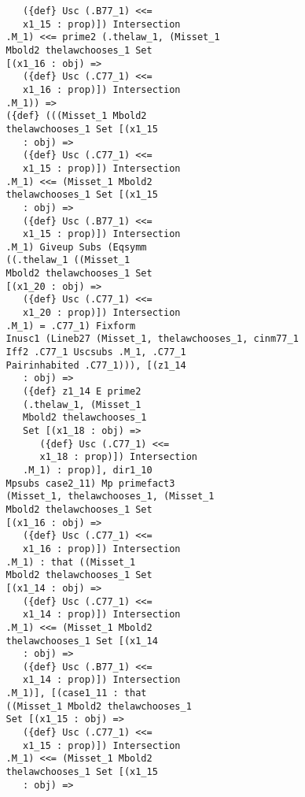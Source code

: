 \documentclass[12pt]{article}
\begin{document}
\begin{verbatim}
                   ({def} Usc (.B77_1) <<= 
                   x1_15 : prop)]) Intersection 
                .M_1) <<= prime2 (.thelaw_1, (Misset_1 
                Mbold2 thelawchooses_1 Set 
                [(x1_16 : obj) => 
                   ({def} Usc (.C77_1) <<= 
                   x1_16 : prop)]) Intersection 
                .M_1)) => 
                ({def} (((Misset_1 Mbold2 
                thelawchooses_1 Set [(x1_15 
                   : obj) => 
                   ({def} Usc (.C77_1) <<= 
                   x1_15 : prop)]) Intersection 
                .M_1) <<= (Misset_1 Mbold2 
                thelawchooses_1 Set [(x1_15 
                   : obj) => 
                   ({def} Usc (.B77_1) <<= 
                   x1_15 : prop)]) Intersection 
                .M_1) Giveup Subs (Eqsymm 
                ((.thelaw_1 ((Misset_1 
                Mbold2 thelawchooses_1 Set 
                [(x1_20 : obj) => 
                   ({def} Usc (.C77_1) <<= 
                   x1_20 : prop)]) Intersection 
                .M_1) = .C77_1) Fixform 
                Inusc1 (Lineb27 (Misset_1, thelawchooses_1, cinm77_1 
                Iff2 .C77_1 Uscsubs .M_1, .C77_1 
                Pairinhabited .C77_1))), [(z1_14 
                   : obj) => 
                   ({def} z1_14 E prime2 
                   (.thelaw_1, (Misset_1 
                   Mbold2 thelawchooses_1 
                   Set [(x1_18 : obj) => 
                      ({def} Usc (.C77_1) <<= 
                      x1_18 : prop)]) Intersection 
                   .M_1) : prop)], dir1_10 
                Mpsubs case2_11) Mp primefact3 
                (Misset_1, thelawchooses_1, (Misset_1 
                Mbold2 thelawchooses_1 Set 
                [(x1_16 : obj) => 
                   ({def} Usc (.C77_1) <<= 
                   x1_16 : prop)]) Intersection 
                .M_1) : that ((Misset_1 
                Mbold2 thelawchooses_1 Set 
                [(x1_14 : obj) => 
                   ({def} Usc (.C77_1) <<= 
                   x1_14 : prop)]) Intersection 
                .M_1) <<= (Misset_1 Mbold2 
                thelawchooses_1 Set [(x1_14 
                   : obj) => 
                   ({def} Usc (.B77_1) <<= 
                   x1_14 : prop)]) Intersection 
                .M_1)], [(case1_11 : that 
                ((Misset_1 Mbold2 thelawchooses_1 
                Set [(x1_15 : obj) => 
                   ({def} Usc (.C77_1) <<= 
                   x1_15 : prop)]) Intersection 
                .M_1) <<= (Misset_1 Mbold2 
                thelawchooses_1 Set [(x1_15 
                   : obj) => 

\end{verbatim}
\end{document}

